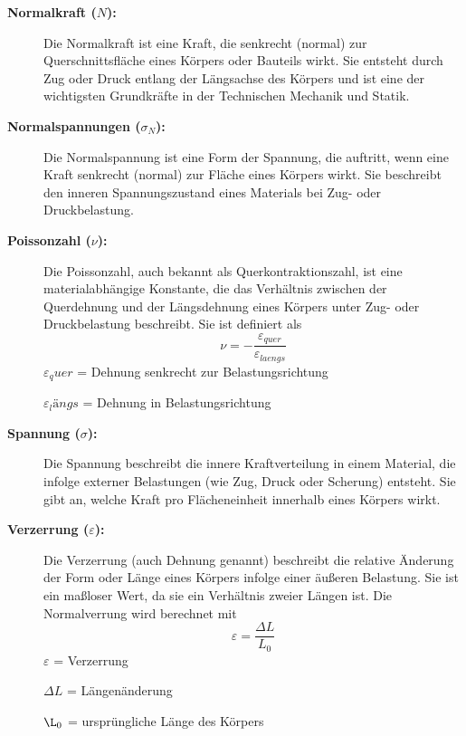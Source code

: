 \begin{description}
	\item[\textbf{Normalkraft ($N$):}] Die Normalkraft ist eine Kraft, die senkrecht (normal) zur Querschnittsfläche eines Körpers oder Bauteils wirkt. 
	Sie entsteht durch Zug oder Druck entlang der Längsachse des Körpers und ist eine der wichtigsten Grundkräfte in der Technischen Mechanik und Statik.
	
	\item[\textbf{Normalspannungen ($\sigma_N$):}] Die Normalspannung ist eine Form der Spannung, die auftritt, wenn eine Kraft senkrecht (normal) zur Fläche eines Körpers wirkt. 
	Sie beschreibt den inneren Spannungszustand eines Materials bei Zug- oder Druckbelastung.
	
	\item[\textbf{Poissonzahl ($\nu$):}] Die Poissonzahl, auch bekannt als Querkontraktionszahl, ist eine materialabhängige Konstante, die das Verhältnis zwischen der Querdehnung und der Längsdehnung eines Körpers unter Zug- oder Druckbelastung beschreibt.
	Sie ist definiert als
	\begin{equation}
		\nu=
		-\frac{\varepsilon_{quer}}{\varepsilon_{laengs}}
	\end{equation}
	$\varepsilon_quer$ = Dehnung senkrecht zur Belastungsrichtung
	
	$\varepsilon_längs$ = Dehnung in Belastungsrichtung
	
	\item[\textbf{Spannung ($\sigma$):}] Die Spannung beschreibt die innere Kraftverteilung in einem Material, die infolge externer Belastungen (wie Zug, Druck oder Scherung) entsteht. 
	Sie gibt an, welche Kraft pro Flächeneinheit innerhalb eines Körpers wirkt.
		
	\item[\textbf{Verzerrung ($\varepsilon$):}] Die Verzerrung (auch Dehnung genannt) beschreibt die relative Änderung der Form oder Länge eines Körpers infolge einer äußeren Belastung. 
	Sie ist ein maßloser Wert, da sie ein Verhältnis zweier Längen ist.
	Die Normalverrung wird berechnet mit
	\begin{equation}
		\varepsilon 
		= \frac{\Delta L}{L_0}
	\end{equation}
	$\varepsilon$ = Verzerrung
	
	$\Delta L$ = Längenänderung
	
	$\L_0$ = ursprüngliche Länge des Körpers
	

\end{description}
